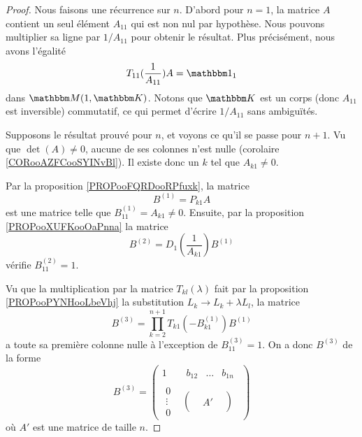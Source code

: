 \begin{proof}
    Nous faisons une récurrence sur \( n\). D'abord pour \( n=1\), la matrice \( A\) contient un seul élément \( A_{11}\) qui est non nul par hypothèse. Nous pouvons multiplier sa ligne par \( 1/A_{11}\) pour obtenir le résultat. Plus précisément, nous avons l'égalité
    \begin{equation}
        T_{11}(\frac{1}{ A_{11} })A=\mtu_1
    \end{equation}
    dans \( \eM(1, \eK)\). Notons que \( \eK\) est un corps (donc \( A_{11}\) est inversible) commutatif, ce qui permet d'écrire \( 1/A_{11}\) sans ambiguïtés.

    Supposons le résultat prouvé pour \( n\), et voyons ce qu'il se passe pour \( n+1\). Vu que \( \det(A)\neq 0\), aucune de ses colonnes n'est nulle (corolaire \ref{CORooAZFCooSYINvBl}). Il existe donc un \( k\) tel que \( A_{k1}\neq 0\).

    Par la proposition \ref{PROPooFQRDooRPfuxk}, la matrice
    \begin{equation}
        B^{(1)}=P_{k1}A
    \end{equation}
    est une matrice telle que \( B^{(1)}_{11}=A_{k1}\neq 0\). Ensuite, par la proposition \ref{PROPooXUFKooOaPnna} la matrice
    \begin{equation}
        B^{(2)}=D_1(\frac{1}{ A_{k1} })B^{(1)}
    \end{equation}
    vérifie \( B^{(2)}_{11}=1\). 

    Vu que la multiplication par la matrice \( T_{kl}(\lambda)\) fait par la proposition \ref{PROPooPYNHooLbeVhj} la substitution \( L_k\to L_{k}+\lambda L_l\), la matrice
    \begin{equation}
        B^{(3)}=\prod_{k=2}^{n+1}T_{k1}(-B^{(1)}_{k1})B^{(1)}
    \end{equation}
    a toute sa première colonne nulle à l'exception de \( B^{(3)}_{11}=1\). On a donc \( B^{(3)} \) de la forme
  \begin{equation}
        B^{(3)}=\begin{pmatrix}
            1    &   \begin{matrix} 
                b_{12}    &   \ldots    &   b_{1n}
            \end{matrix}\\ 
            \begin{matrix}
                0    \\ 
                \vdots    \\ 
                0    
            \end{matrix}&   \begin{pmatrix}
                    &       &       \\
                    &   A'    &       \\
                    &       &   
            \end{pmatrix}
        \end{pmatrix}
    \end{equation}
    où \( A'\) est une matrice de taille \( n\).
    

\end{proof}
